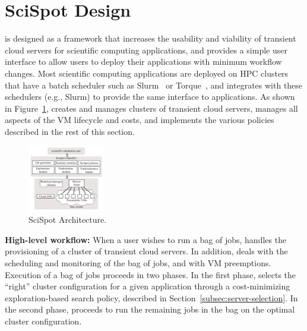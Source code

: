 \section{SciSpot Design}
\label{sec:design}





\sysname is designed as a framework that increases the usability and viability of transient cloud servers for scientific computing applications, and provides a simple user interface to allow users to deploy their applications with minimum workflow changes. 
Most scientific computing applications are deployed on HPC clusters that have a batch scheduler such as Slurm~\cite{slurm} or Torque~\cite{torque}, and \sysname integrates with these schedulers (e.g., Slurm) to provide the same interface to applications. 
As shown in Figure~\ref{fig:arch},
\sysname creates and manages clusters of transient cloud servers, manages all aspects of the VM lifecycle and costs, and implements the various policies described in the rest of this section. 

\begin{figure}[t]
  \includegraphics[width=0.3\textwidth]{../figures/Architecture.png}
\vspace*{\myfigspace}
  \caption{SciSpot Architecture.}
  \label{fig:arch}
  \vspace*{\myfigspace}
\end{figure}


\noindent \textbf{High-level workflow:} When a user wishes to run a bag of jobs, \sysname handles the provisioning of a cluster of transient cloud servers.
In addition, \sysname deals with the scheduling and monitoring of the bag of jobs, and with VM preemptions. 
Execution of a bag of jobs proceeds in two phases.
In the first phase, \sysname selects the ``right'' cluster configuration for a given application through a cost-minimizing exploration-based search policy, described in Section~\ref{subsec:server-selection}. 
In the second phase, \sysname proceeds to run the remaining jobs in the bag on the optimal cluster configuration. 

